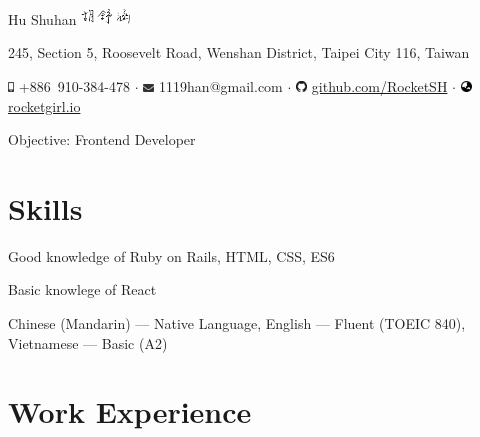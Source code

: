 \documentclass[a4paper,10pt]{article}
\begin{document}
\pagestyle{empty} %
\frenchspacing


\begin{center}
  \Huge{Hu Shuhan \includegraphics[height=1.2em,trim=0 10mm 0 -1cm]{shared/signature.png}}\par

\normalsize 245, Section 5, Roosevelt Road, Wenshan District, Taipei City 116, Taiwan 

  \includegraphics[height=0.7em]{shared/mobile-alt.eps} +886~910-384-478 $\cdot$
  \includegraphics[width=0.8em]{shared/envelope.eps} 1119han@gmail.com $\cdot$
  \includegraphics[width=0.8em]{shared/github.eps}
  \href{https://github.com/RocketSH}{github.com/RocketSH} $\cdot$
  \includegraphics[width=0.8em]{shared/globe-asia.eps} \href{https://rocketgirl.io/}{rocketgirl.io}

  \vspace*{1em}
{\centering\sffamily \large Objective: Frontend Developer}
\end{center}


\section{Skills}
Good knowledge of Ruby on Rails, HTML, CSS, ES6

Basic knowlege of React

{Chinese (Mandarin)} --- Native Language, {English} --- Fluent (TOEIC 840), {Vietnamese} --- Basic (A2)

\section{Work Experience}
\end{document}
